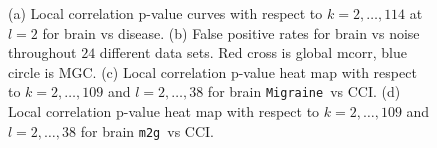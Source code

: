 \documentclass[11pt]{article}
\providecommand{\sct}[1]{{\sc \texttt{#1}}}
\newcommand{\Migraine}{\sct{Migraine}}
\newcommand{\mtg}{\sct{m2g}}
\begin{document}
\begin{figure}[htbp]
\centering
{}
\hfil
\centering
{}
\hfil
\centering
{}
\hfil
\centering
{}
\caption{
(a) Local correlation p-value curves with respect to $k=2,\ldots,114$ at $l=2$ for brain vs disease. 
(b) False positive rates for brain vs noise throughout $24$ different data sets. Red cross is global mcorr, blue circle is MGC.
(c) Local correlation p-value heat map with respect to $k=2,\ldots,109$ and $l=2,\ldots,38$ for brain \Migraine~vs CCI.
(d) Local correlation p-value heat map with respect to $k=2,\ldots,109$ and $l=2,\ldots,38$ for brain \mtg~vs CCI. }
\label{figReal}
\end{figure}
\end{document}
